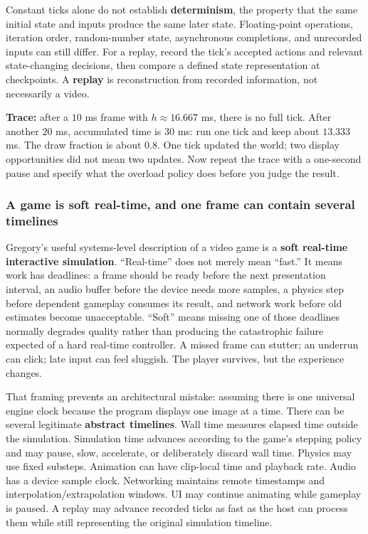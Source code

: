 Constant ticks alone do not establish \textbf{determinism}, the property that the same initial state and inputs produce the same later state. Floating-point operations, iteration order, random-number state, asynchronous completions, and unrecorded inputs can still differ. For a replay, record the tick's accepted actions and relevant state-changing decisions, then compare a defined state representation at checkpoints. A \textbf{replay} is reconstruction from recorded information, not necessarily a video.

\textbf{Trace:} after a \(10\) ms frame with \(h\approx16.667\) ms, there is no full tick. After another \(20\) ms, accumulated time is \(30\) ms: run one tick and keep about \(13.333\) ms. The draw fraction is about \(0.8\). One tick updated the world; two display opportunities did not mean two updates. Now repeat the trace with a one-second pause and specify what the overload policy does before you judge the result.

\subsubsection{A game is soft real-time, and one frame can contain several timelines}\label{05-engine-i-ch013-a-game-is-soft-real-time-and-one-frame-can-contain-several-timelines}

\hypertarget{05-engine-i-ch013-a-game-is-soft-real-time-and-one-frame-can-contain-several-timelines}{}

Gregory's useful systems-level description of a video game is a \textbf{soft real-time interactive simulation}. ``Real-time'' does not merely mean ``fast.'' It means work has deadlines: a frame should be ready before the next presentation interval, an audio buffer before the device needs more samples, a physics step before dependent gameplay consumes its result, and network work before old estimates become unacceptable. ``Soft'' means missing one of those deadlines normally degrades quality rather than producing the catastrophic failure expected of a hard real-time controller. A missed frame can stutter; an underrun can click; late input can feel sluggish. The player survives, but the experience changes.

That framing prevents an architectural mistake: assuming there is one universal engine clock because the program displays one image at a time. There can be several legitimate \textbf{abstract timelines}. Wall time measures elapsed time outside the simulation. Simulation time advances according to the game's stepping policy and may pause, slow, accelerate, or deliberately discard wall time. Physics may use fixed substeps. Animation can have clip-local time and playback rate. Audio has a device sample clock. Networking maintains remote timestamps and interpolation/extrapolation windows. UI may continue animating while gameplay is paused. A replay may advance recorded ticks as fast as the host can process them while still representing the original simulation timeline.

